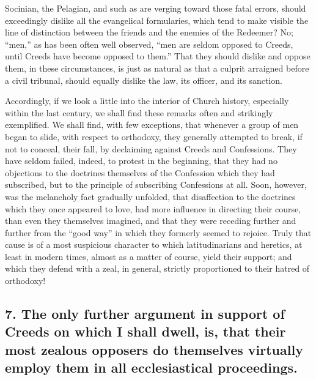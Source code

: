 \documentclass[
]{book}
\begin{document}
Socinian, the Pelagian, and such as are verging toward those fatal errors, should exceedingly dislike all the evangelical formularies, which tend to make visible the line of distinction between the friends and the enemies of the Redeemer? No; ``men,'' as has been often well observed, ``men are seldom opposed to Creeds, until Creeds have become opposed to them.'' That they should dislike and oppose them, in these circumstances, is just as natural as that a culprit arraigned before a civil tribunal, should equally dislike the law, its officer, and its sanction.

Accordingly, if we look a little into the interior of Church history, especially within the last century, we shall find these remarks often and strikingly exemplified. We shall find, with few exceptions, that whenever a group of men began to slide, with respect to orthodoxy, they generally attempted to break, if not to conceal, their fall, by declaiming against Creeds and Confessions. They have seldom failed, indeed, to protest in the beginning, that they had no objections to the doctrines themselves of the Confession which they had subscribed, but to the principle of subscribing Confessions at all. Soon, however, was the melancholy fact gradually unfolded, that disaffection to the doctrines which they once appeared to love, had more influence in directing their course, than even they themselves imagined, and that they were receding further and further from the ``good way'' in which they formerly seemed to rejoice. Truly that cause is of a most suspicious character to which latitudinarians and heretics, at least in modern times, almost as a matter of course, yield their support; and which they defend with a zeal, in general, strictly proportioned to their hatred of orthodoxy!

\hypertarget{the-only-further-argument-in-support-of-creeds-on-which-i-shall-dwell-is-that-their-most-zealous-opposers-do-themselves-virtually-employ-them-in-all-ecclesiastical-proceedings.}{%
\subsection{7. The only further argument in support of Creeds on which I shall dwell, is, that their most zealous opposers do themselves virtually employ them in all ecclesiastical proceedings.}\label{the-only-further-argument-in-support-of-creeds-on-which-i-shall-dwell-is-that-their-most-zealous-opposers-do-themselves-virtually-employ-them-in-all-ecclesiastical-proceedings.}}
\end{document}
